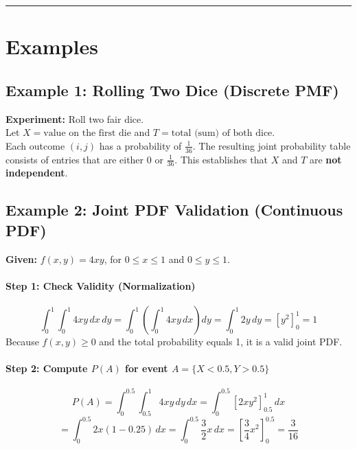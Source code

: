 \documentclass{article}
\begin{document}
\strut\hrule
\section*{Examples}

\subsection*{Example 1: Rolling Two Dice (Discrete PMF)}
\textbf{Experiment:} Roll two fair dice. \\
Let $X = \text{value on the first die}$ and $T = \text{total (sum) of both dice}$. \\
Each outcome $(i,j)$ has a probability of $\frac{1}{36}$. The resulting joint probability table consists of entries that are either $0$ or $\frac{1}{36}$. This establishes that $X$ and $T$ are \textbf{not independent}.

\subsection*{Example 2: Joint PDF Validation (Continuous PDF)}
\textbf{Given:} $f(x,y) = 4xy$, for $0 \le x \le 1$ and $0 \le y \le 1$.

\paragraph{Step 1: Check Validity (Normalization)}
\[ \int_{0}^{1}\int_{0}^{1} 4xy \, dx \, dy = \int_{0}^{1} \left( \int_{0}^{1} 4xy \, dx \right) dy = \int_{0}^{1} 2y \, dy = [y^2]_{0}^{1} = 1 \]
Because $f(x,y) \ge 0$ and the total probability equals 1, it is a valid joint PDF.

\paragraph{Step 2: Compute $P(A)$ for event $A = \{X < 0.5, Y > 0.5\}$}
\[ P(A) = \int_{0}^{0.5}\int_{0.5}^{1} 4xy \, dy \, dx = \int_{0}^{0.5} [2xy^2]_{0.5}^{1} \, dx \]
\[ = \int_{0}^{0.5} 2x(1 - 0.25) \, dx = \int_{0}^{0.5} \frac{3}{2}x \, dx = \left[ \frac{3}{4}x^2 \right]_{0}^{0.5} = \frac{3}{16} \]
\end{document}
